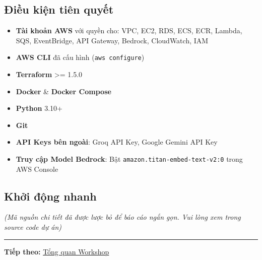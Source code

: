 \hypertarget{ux111iux1ec1u-kiux1ec7n-tiuxean-quyux1ebft}{%
\subsection{Điều kiện tiên
quyết}}

\begin{itemize}
\tightlist
\item
  \textbf{Tài khoản AWS} với quyền cho: VPC, EC2, RDS, ECS, ECR, Lambda,
  SQS, EventBridge, API Gateway, Bedrock, CloudWatch, IAM
\item
  \textbf{AWS CLI} đã cấu hình (\texttt{aws\ configure})
\item
  \textbf{Terraform} \textgreater= 1.5.0
\item
  \textbf{Docker} \& \textbf{Docker Compose}
\item
  \textbf{Python} 3.10+
\item
  \textbf{Git}
\item
  \textbf{API Keys bên ngoài}: Groq API Key, Google Gemini API Key
\item
  \textbf{Truy cập Model Bedrock}: Bật
  \texttt{amazon.titan-embed-text-v2:0} trong AWS Console
\end{itemize}

\hypertarget{khux1edfi-ux111ux1ed9ng-nhanh}{%
\subsection{Khởi động nhanh}}

\emph{(Mã nguồn chi tiết đã được lược bỏ để báo cáo ngắn gọn. Vui lòng
xem trong source code dự án)}

\begin{center}\rule{0.5\linewidth}{0.5pt}\end{center}

\textbf{Tiếp theo:} \href{5.1-Workshop-overview/}{Tổng quan Workshop}

